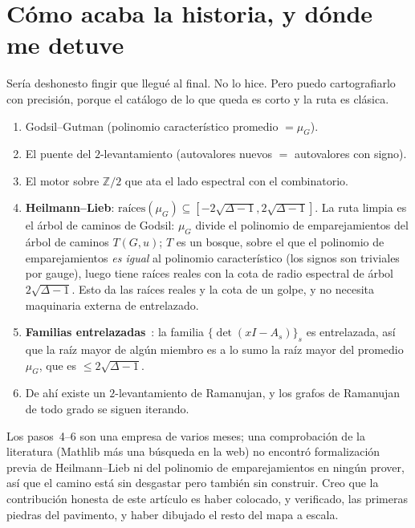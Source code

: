 \documentclass[11pt]{article}
\newcommand{\Z}{\mathbb{Z}}
\begin{document}
\section{Cómo acaba la historia, y dónde me detuve}
\label{sec:future}

Sería deshonesto fingir que llegué al final. No lo hice. Pero puedo
cartografiarlo con precisión, porque el catálogo de lo que queda es corto y la
ruta es clásica.
\begin{enumerate}\itemsep2pt
\item[$\checkmark$] Godsil--Gutman (polinomio característico promedio $=\mu_G$).
\item[$\checkmark$] El puente del $2$-levantamiento (autovalores nuevos $=$
  autovalores con signo).
\item[$\checkmark$] El motor sobre $\Z/2$ que ata el lado espectral con el
  combinatorio.
\item[$\circ$] \textbf{Heilmann--Lieb}: $\text{raíces}(\mu_G)\subseteq
  [-2\sqrt{\Delta-1},2\sqrt{\Delta-1}]$. La ruta limpia es el árbol de caminos de
  Godsil: $\mu_G$ divide el polinomio de emparejamientos del árbol de caminos
  $T(G,u)$; $T$ es un bosque, sobre el que el polinomio de emparejamientos
  \emph{es igual} al polinomio característico (los signos son triviales por gauge),
  luego tiene raíces reales con la cota de radio espectral de árbol
  $2\sqrt{\Delta-1}$. Esto da las raíces reales y la cota de un golpe, y no
  necesita maquinaria externa de entrelazado.
\item[$\circ$] \textbf{Familias entrelazadas}~\cite{MSS2015a}: la familia
  $\{\det(xI-A_s)\}_s$ es entrelazada, así que la raíz mayor de algún miembro es a
  lo sumo la raíz mayor del promedio $\mu_G$, que es $\le2\sqrt{\Delta-1}$.
\item[$\circ$] De ahí existe un $2$-levantamiento de Ramanujan, y los grafos de
  Ramanujan de todo grado se siguen iterando.
\end{enumerate}
Los pasos~4--6 son una empresa de varios meses; una comprobación de la literatura
(Mathlib más una búsqueda en la web) no encontró formalización previa de
Heilmann--Lieb ni del polinomio de emparejamientos en ningún prover, así que el
camino está sin desgastar pero también sin construir. Creo que la contribución
honesta de este artículo es haber colocado, y verificado, las primeras piedras del
pavimento, y haber dibujado el resto del mapa a escala.

\end{document}
